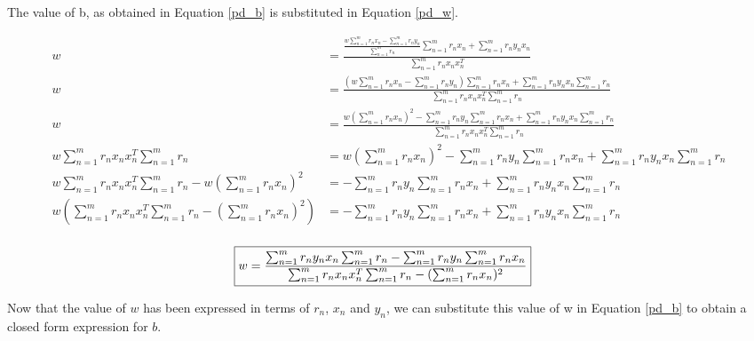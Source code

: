 \documentclass[a4paper]{article}
\begin{document}
The value of b, as obtained in Equation \ref{pd_b} is substituted in Equation \ref{pd_w}.

\begin{align*}
	w &= \frac{\frac{w \sum_{n=1}^m r_n x_n - \sum_{n=1}^m r_n y_n}{\sum_{n=1}^m r_n} \sum_{n=1}^m r_n x_n + \sum_{n=1}^m r_n y_n x_n} {\sum_{n=1}^m r_n x_n x_n^T}\\
	w &= \frac{(w \sum_{n=1}^m r_n x_n - \sum_{n=1}^m r_n y_n) \sum_{n=1}^m r_n x_n + \sum_{n=1}^m r_n y_n x_n \sum_{n=1}^m r_n} {\sum_{n=1}^m r_n x_n x_n^T \sum_{n=1}^m r_n}\\
	w &= \frac{w ({\sum_{n=1}^m r_n x_n})^2 - \sum_{n=1}^m r_n y_n \sum_{n=1}^m r_n x_n + \sum_{n=1}^m r_n y_n x_n \sum_{n=1}^m r_n} {\sum_{n=1}^m r_n x_n x_n^T \sum_{n=1}^m r_n}\\
	w \sum_{n=1}^m r_n x_n x_n^T \sum_{n=1}^m  r_n &= w ({\sum_{n=1}^m r_n x_n})^2 - \sum_{n=1}^m  r_n y_n \sum_{n=1}^m  r_n x_n + \sum_{n=1}^m  r_n y_n x_n \sum_{n=1}^m  r_n\\
	w \sum_{n=1}^m r_n x_n x_n^T \sum_{n=1}^m  r_n - w ({\sum_{n=1}^m r_n x_n})^2 &= - \sum_{n=1}^m  r_n y_n \sum_{n=1}^m  r_n x_n + \sum_{n=1}^m  r_n y_n x_n \sum_{n=1}^m  r_n\\
	w (\sum_{n=1}^m r_n x_n x_n^T \sum_{n=1}^m  r_n - ({\sum_{n=1}^m r_n x_n})^2) &= - \sum_{n=1}^m  r_n y_n \sum_{n=1}^m  r_n x_n + \sum_{n=1}^m  r_n y_n x_n \sum_{n=1}^m  r_n\\
\end{align*}

\begin{align}
\label{cf_w}
	\Aboxed{w  = \frac{\sum_{n=1}^m  r_n y_n x_n \sum_{n=1}^m  r_n - \sum_{n=1}^m  r_n y_n \sum_{n=1}^m  r_n x_n}{\sum_{n=1}^m r_n x_n x_n^T \sum_{n=1}^m  r_n - ({\sum_{n=1}^m r_n x_n})^2}}
\end{align}

\vspace{10mm}

Now that the value of $w$ has been expressed in terms of $r_n$, $x_n$ and $y_n$, we can substitute this value of w in Equation \ref{pd_b} to obtain a closed form expression for $b$.
\end{document}

